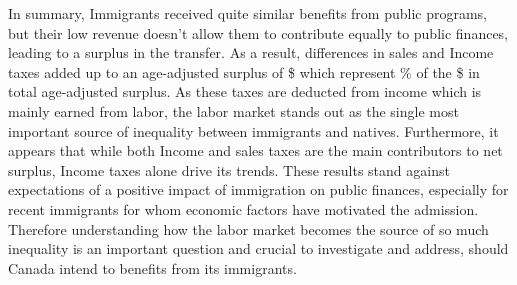 \vspace{0.7em}\par
In summary, Immigrants received quite similar benefits from public programs, but their low revenue doesn't allow them to contribute equally to public finances, leading to a surplus in the transfer.
As a result, differences in sales and Income taxes added up to an age-adjusted surplus of \$ which  represent \% of the \$ in total age-adjusted surplus.
As these taxes are deducted from income which is mainly earned from labor, the labor market stands out as the single most important source of inequality between immigrants and natives.
Furthermore, it appears that while both Income and sales taxes are the main contributors to net surplus, Income taxes alone drive its trends.
These results stand against expectations of a positive impact of immigration on public finances, especially for recent immigrants for whom economic factors have motivated the admission.
Therefore understanding how the labor market becomes the source of so much inequality is an important question and crucial to investigate and address, should Canada intend to benefits from its immigrants.


















